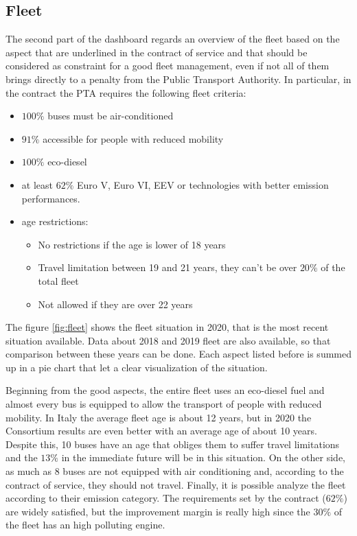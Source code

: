 \newpage
\begin{landscape}
\thispagestyle{empty}

\end{landscape}
\newpage

\subsection{Fleet}

The second part of the dashboard regards an overview of the fleet based on the aspect that are underlined in the contract of service and that should be considered as constraint for a good fleet management, even if not all of them brings directly to a penalty from the Public Transport Authority. 
In particular, in the contract the PTA requires the following fleet criteria:
\begin{itemize}
\item $100\%$ buses must be air-conditioned
\item $91\%$ accessible for people with reduced mobility
\item  $100\%$ eco-diesel
\item at least $62\%$ Euro V, Euro VI, EEV or technologies with better emission performances.
\item  age restrictions:
    \begin{itemize}
        \item No restrictions if the age is lower of 18 years
        \item Travel limitation between 19 and 21 years, they can't be over $20\%$ of the total fleet
        \item Not allowed if they are over 22 years
    \end{itemize}
\end{itemize}
The figure \ref{fig:fleet}
shows the fleet situation in 2020, that is the most recent situation available. Data about 2018 and 2019 fleet are also available, so that comparison between these years can be done. Each aspect listed before is summed up in a pie chart that let a clear visualization of the situation.

Beginning from the good aspects, the entire fleet uses an eco-diesel fuel and almost every bus is equipped to allow the transport of people with reduced mobility. 
In Italy the average fleet age is about 12 years\cite{rossiPTM}, but in 2020 the Consortium results are even better with an average age of about 10 years. Despite this, 10 buses have an age that obliges them to suffer travel limitations and the $13\%$ in the immediate future will be in this situation. 
On the other side, as much as 8 buses are not equipped with air conditioning and, according to the contract of service, they should not travel. Finally, it is possible analyze the fleet according to their emission category. The requirements set by the contract ($62\%$) are widely satisfied, but the improvement margin is really high since the $30\%$ of the fleet has an high polluting engine. 


